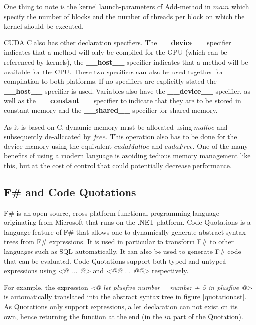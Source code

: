 One thing to note is the kernel launch-parameters of Add-method in $main$ which specify the number of blocks and the number of threads per block on which the kernel should be executed. 

CUDA C also has other declaration specifiers. 
The \textbf{\_\_device\_\_} specifier indicates that a method will only be compiled for the GPU (which can be referenced by kernels), the \textbf{\_\_host\_\_} specifier indicates that a method will be available for the CPU.
These two specifiers can also be used together for compilation to both platforms.
If no specifiers are explicitly stated the \textbf{\_\_host\_\_} specifier is used.
Variables also have the \textbf{\_\_device\_\_} specifier, as well as the \textbf{\_\_constant\_\_} specifier to indicate that they are to be stored in constant memory and the \textbf{\_\_shared\_\_} specifier for shared memory.

As it is based on C, dynamic memory must be allocated using $malloc$ and subsequently de-allocated by $free$.
This operation also has to be done for the device memory using the equivalent $cudaMalloc$ and $cudaFree$.
One of the many benefits of using a modern language is avoiding tedious memory management like this, but at the cost of control that could potentially decrease performance.

\subsection{F\# and Code Quotations}\label{subsec:background:codequotations}
F\#\cite{fsharp} is an open source, cross-platform functional programming language originating from Microsoft that runs on the .NET platform.
Code Quotations is a language feature of F\# that allows one to dynamically generate abstract syntax trees from F\# expressions. 
It is used in particular to transform F\# to other languages such as SQL automatically. 
It can also be used to generate F\# code that can be evaluated. 
Code Quotations support both typed and untyped expressions using \emph{\textless @ ... @\textgreater} and \emph{\textless @@ ... @@\textgreater} respectively. 

For example, the expression \emph{\textless @ let plusfive number = number + 5 in plusfive @\textgreater} is automatically translated into the abstract syntax tree in figure \ref{quotationast}. 
As Quotations only support expressions, a let declaration can not exist on its own, hence returning the function at the end (in the $in$ part of the Quotation).

